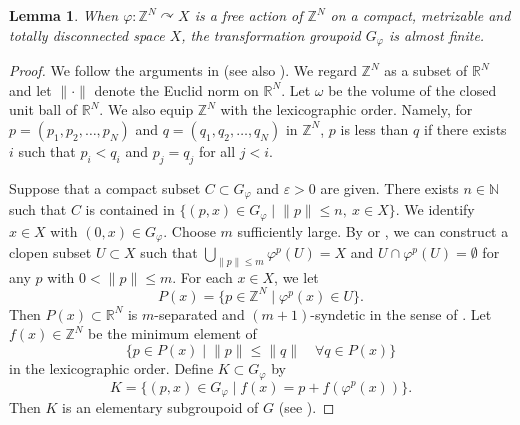 \documentclass[11pt]{article}
\newtheorem{lem}[thm]{Lemma}
\theoremstyle{definition}
\renewcommand{\phi}{\varphi}
\newcommand{\ep}{\varepsilon}
\newcommand{\N}{\mathbb{N}}
\newcommand{\Z}{\mathbb{Z}}
\newcommand{\R}{\mathbb{R}}
\begin{document}
\begin{lem}\label{ZNisAF}
When $\phi:\Z^N\curvearrowright X$ is a free action of $\Z^N$ 
on a compact, metrizable and totally disconnected space $X$, 
the transformation groupoid $G_\phi$ is almost finite. 
\end{lem}
\begin{proof}
We follow the arguments in \cite{F} (see also \cite{GMPS,GMPS2}). 
We regard $\Z^N$ as a subset of $\R^N$ and 
let $\lVert\cdot\rVert$ denote the Euclid norm on $\R^N$. 
Let $\omega$ be the volume of the closed unit ball of $\R^N$. 
We also equip $\Z^N$ with the lexicographic order. 
Namely, for $p=(p_1,p_2,\dots,p_N)$ and $q=(q_1,q_2,\dots,q_N)$ in $\Z^N$, 
$p$ is less than $q$ if there exists $i$ such that 
$p_i<q_i$ and $p_j=q_j$ for all $j<i$. 

Suppose that a compact subset $C\subset G_\phi$ and $\ep>0$ are given. 
There exists $n\in\N$ such that 
$C$ is contained in $\{(p,x)\in G_\phi\mid\lVert p\rVert\leq n,\ x\in X\}$. 
We identify $x\in X$ with $(0,x)\in G_\phi$. 
Choose $m$ sufficiently large. 
By \cite[Lemma 20]{LiO} or \cite[Proposition 4.4]{GMPS}, 
we can construct a clopen subset $U\subset X$ such that 
$\bigcup_{\lVert p\rVert\leq m}\phi^p(U)=X$ and 
$U\cap\phi^p(U)=\emptyset$ for any $p$ with $0<\lVert p\rVert\leq m$. 
For each $x\in X$, we let 
\[
P(x)=\{p\in\Z^N\mid\phi^p(x)\in U\}. 
\]
Then $P(x)\subset\R^N$ is $m$-separated and $(m{+}1)$-syndetic 
in the sense of \cite{GMPS}. 
Let $f(x)\in\Z^N$ be the minimum element of 
\[
\{p\in P(x)\mid\lVert p\rVert\leq\lVert q\rVert\quad\forall q\in P(x)\}
\]
in the lexicographic order. 
Define $K\subset G_\phi$ by 
\[
K=\{(p,x)\in G_\phi\mid f(x)=p+f(\phi^p(x))\}. 
\]
Then $K$ is an elementary subgroupoid of $G$ (see \cite{F,GMPS}). 


\end{proof}
\end{document}
